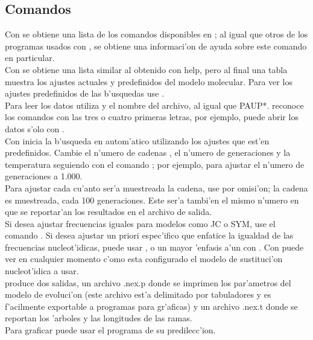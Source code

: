 \subsection{Comandos}
Con  se obtiene una lista de los comandos disponibles en ; al igual que otros de los programas usados con , se obtiene una informaci'on de ayuda sobre este comando en particular.\\
Con  se obtiene una lista similar al obtenido con help, pero al final una tabla muestra los ajustes actuales y predefinidos del modelo molecular. Para ver los ajustes predefinidos de las b'usquedas use .\\
Para leer los datos  utiliza  y el nombre del archivo, al igual que {PAUP*}.  reconoce los comandos con las tres o cuatro primeras letras, por ejemplo, puede abrir los datos s'olo con .\\
Con   inicia la b'usqueda en autom'atico utilizando los ajustes que est'en predefinidos. Cambie el n'umero de cadenas , el n'umero de generaciones  y la temperatura  seguiendo con el comando ;
por ejemplo,  para ajustar el n'umero de generaciones a 1.000.\\
Para ajustar cada cu'anto ser'a muestreada la cadena, use  por omisi'on; la cadena es muestreada, cada 100 generaciones. Este ser'a tambi'en el mismo n'umero en que se reportar'an los resultados en el archivo de salida.\\
Si  desea ajustar frecuencias iguales para modelos como  JC o SYM, use el comando . 
Si desea ajustar un priori espec'ifico que enfatice la igualdad de las frecuencias nucleot'idicas,  puede usar , o un mayor 'enfasis a'un con . Con  puede ver en cualquier momento c'omo esta configurado el modelo de sustituci'on nucleot'idica a usar.\\
 produce dos salidas, un archivo .nex.p donde se imprimen los par'ametros del modelo de evoluci'on (este archivo est'a delimitado por tabuladores y es f'acilmente exportable a programas para gr'aficas) y un archivo .nex.t donde se reportan los 'arboles y las longitudes de las ramas.\\
Para graficar puede usar el programa de su predilecc'ion. 
